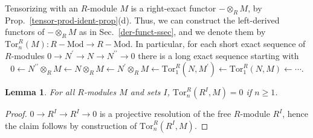 \documentclass{amsart}
\theoremstyle{plain}
\numberwithin{equation}{section} %
\numberwithin{figure}{section} %
\theoremstyle{plain}
\theoremstyle{plain}
\theoremstyle{plain}
\theoremstyle{plain}
\newtheorem{lem}[thm]{Lemma} %
\theoremstyle{plain}
\theoremstyle{plain}
\theoremstyle{remark}
\theoremstyle{remark}
\theoremstyle{remark}
\begin{document}
Tensorizing with an $R$-module $M$ is a right-exact functor $- \otimes_R M$, by Prop.~\ref{tensor-prod-ident-prop}(d). Thus, we can construct the left-derived functors of $- \otimes_R M$ as in Sec.~\ref{der-funct-ssec}, and we denote them by $\mathrm{Tor}_n^R(M): R-\mathrm{Mod} \rightarrow R-\mathrm{Mod}$. In particular, for each short exact sequence of $R$-modules $0 \rightarrow N^\prime \rightarrow N \rightarrow N^{\prime\prime} \rightarrow 0$ there is a long exact sequence starting with
\[ 0 \leftarrow N^{\prime\prime} \otimes_R M \leftarrow N \otimes_R M \leftarrow N^\prime \otimes_R M \leftarrow    
   \mathrm{Tor}_1^R(N,M^\prime) \leftarrow \mathrm{Tor}_1^R(N,M) \leftarrow \cdots . \]
\begin{lem} \label{tor-free-zero-lem}
For all $R$-modules $M$ and sets $I$, $\mathrm{Tor}_n^R(R^I,M) = 0$ if $n \geq 1$.
\end{lem}
\begin{proof}
$0 \rightarrow R^I \rightarrow R^I \rightarrow 0$ is a projective resolution of the free $R$-module $R^I$, hence the claim follows by construction of $\mathrm{Tor}_n^R(R^I,M)$.
\end{proof}
\end{document}
